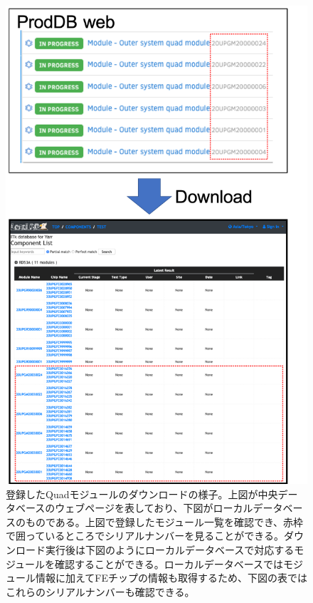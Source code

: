 \begin{figure}[bpt]\centering
\includegraphics[width=14cm]{registerd_kek_module_viewer}
\caption[登録したQuadモジュールのダウンロードの様子]{登録したQuadモジュールのダウンロードの様子。上図が中央データベースのウェブページを表しており、下図がローカルデータベースのものである。上図で登録したモジュール一覧を確認でき、赤枠で囲っているところでシリアルナンバーを見ることができる。ダウンロード実行後は下図のようにローカルデータベースで対応するモジュールを確認することができる。ローカルデータベースではモジュール情報に加えてFEチップの情報も取得するため、下図の表ではこれらのシリアルナンバーも確認できる。}
\label{registered_kek_module_viewer}
\end{figure}

